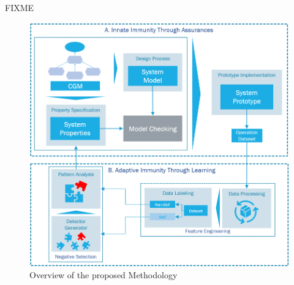 

FIXME
\begin{figure}[!h]
	\centering
	\includegraphics[width=0.999\textwidth, keepaspectratio]{img/overview_framework2.png}
	\caption{Overview of the proposed Methodology}
	\label{fig:FrameworkOverview}
\end{figure}

